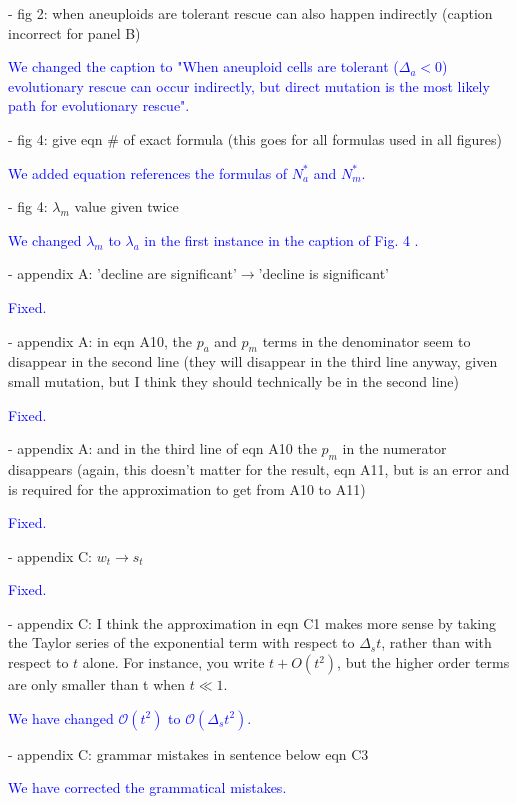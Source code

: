 \documentclass[12pt]{extarticle}
\begin{document}
- fig 2: when aneuploids are tolerant rescue can also happen indirectly (caption incorrect for panel B)

\textcolor{blue}{%
We changed the caption to "When aneuploid cells are tolerant ($\Delta_a<0$) evolutionary rescue can occur indirectly, but direct mutation is the most likely path for evolutionary rescue".
} 

- fig 4: give eqn $\#$ of exact formula (this goes for all formulas used in all figures)

\textcolor{blue}{%
We added equation references the formulas of $N_a^*$ and $N_m^*$.
} 

- fig 4: $\lambda_m$ value given twice

\textcolor{blue}{%
We changed $\lambda_m$ to $\lambda_a$ in the first instance in the caption of Fig. 4 .
} 

- appendix A: 'decline are significant'$\rightarrow$'decline is significant'

\textcolor{blue}{Fixed.}  %

- appendix A: in eqn A10, the $p_a$ and $p_m$ terms in the denominator seem to disappear in the second line (they will disappear in the third line anyway, given small mutation, but I think they should technically be in the second line)

\textcolor{blue}{Fixed.} %

- appendix A: and in the third line of eqn A10 the $p_m$ in the numerator disappears (again, this doesn't matter for the result, eqn A11, but is an error and is required for the approximation to get from A10 to A11)

\textcolor{blue}{Fixed.} %

- appendix C: $w_t\rightarrow s_t$

\textcolor{blue}{Fixed.} %

- appendix C: I think the approximation in eqn C1 makes more sense by taking the Taylor series of the exponential term with respect to $\Delta_st$, rather than with respect to $t$ alone. For instance, you write $t + O(t^2)$, but the higher order terms are only smaller than t when $t\ll1$.

\textcolor{blue}{We have changed $\mathcal{O}\left(t^2\right)$ to $\mathcal{O}\left(\Delta_st^2\right)$. } %

- appendix C: grammar mistakes in sentence below eqn C3

\textcolor{blue}{We have corrected the grammatical mistakes. } %
\end{document}
